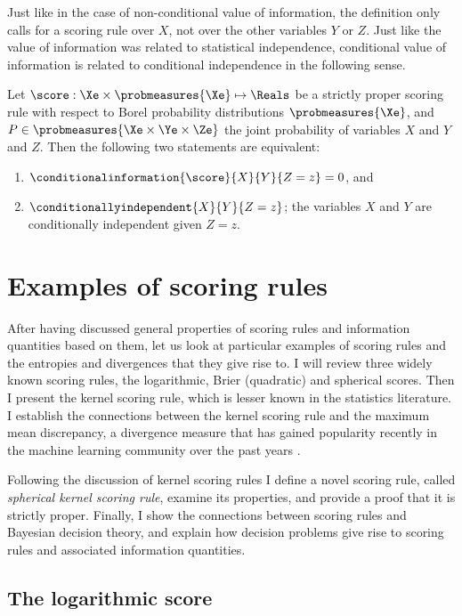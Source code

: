 Just like in the case of non-conditional value of information, the definition only calls for a scoring rule over $X$, not over the other variables $Y$ or $Z$. Just like the value of information was related to statistical independence, conditional value of information is related to conditional independence in the following sense.

\begin{statement}
	Let $\score:\Xe\times\probmeasures{\Xe}\mapsto\Reals$ be a strictly proper scoring rule with respect to Borel probability distributions $\probmeasures{\Xe}$, and $P\in\probmeasures{\Xe\times\Ye\times\Ze}$ the joint probability of variables $X$ and $Y$ and $Z$. Then the following two statements are equivalent:
	\begin{enumerate}
		\item $\conditionalinformation{\score}{X}{Y}{Z=z} = 0$, and
		\item $\conditionallyindependent{X}{Y}{Z=z}$; the variables $X$ and $Y$ are conditionally independent given $Z=z$.
	\end{enumerate}
\end{statement}


\section{Examples of scoring rules}

After having discussed general properties of scoring rules and information quantities based on them, let us look at particular examples of scoring rules and the entropies and divergences that they give rise to. I will review three widely known scoring rules, the logarithmic, Brier (quadratic) and spherical scores. Then I present the kernel scoring rule, which is lesser known in the statistics literature. I establish the connections between the kernel scoring rule and the maximum mean discrepancy, a divergence measure that has gained popularity recently in the machine learning community over the past years \citep{Gretton2012,Sriperumbudur2008}.

Following the discussion of kernel scoring rules I define a novel scoring rule, called \emph{spherical kernel scoring rule}, examine its properties, and provide a proof that it is strictly proper. Finally, I show the connections between scoring rules and Bayesian decision theory, and explain how decision problems give rise to scoring rules and associated information quantities.

\subsection{The logarithmic score\label{sec:log_score}}

